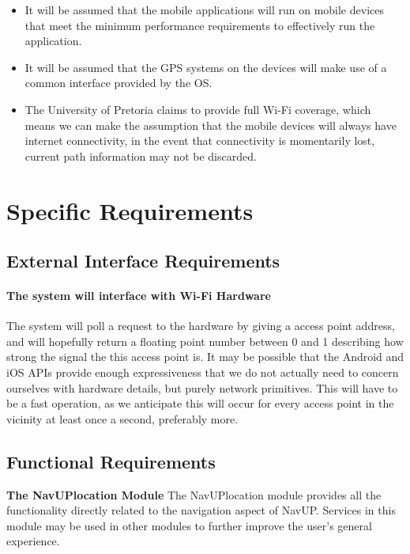\documentclass[12pt,a4paper]{article}
\begin{document}
			\begin{itemize}

				\item It will be assumed that the mobile applications will run on mobile devices that 
				meet the minimum performance requirements to effectively run the application.
				\item It will be assumed that the GPS systems on the devices will make use of a common 
				interface provided by the OS.
				\item The University of Pretoria claims to provide full Wi-Fi coverage, which means we can 
				make the assumption that the mobile devices will always have internet connectivity, in the 
				event that connectivity is momentarily lost, current path information may not be discarded.

			\end{itemize}


	\section{Specific Requirements}

		\subsection{External Interface Requirements}

			\paragraph{The system will interface with Wi-Fi Hardware}

				The system will poll a request to the hardware by giving a access point
				address, and will hopefully return a floating point number between 0 and
				 1 describing how strong the signal the this access point is. It may be
				 possible that the Android and iOS APIs provide enough expressiveness
				 that we do not actually need to concern ourselves with hardware
				 details, but purely network primitives. This will have to be a fast
				operation, as we anticipate this will occur for every access point in
				the vicinity at least once a second, preferably more.


		\subsection{Functional Requirements}


			\textbf{The NavUPlocation Module} \newline \newline
			The NavUPlocation module provides all the functionality directly related to the navigation aspect of NavUP. 					Services in this module may be used in other modules to further improve the user's general experience.
\end{document}

